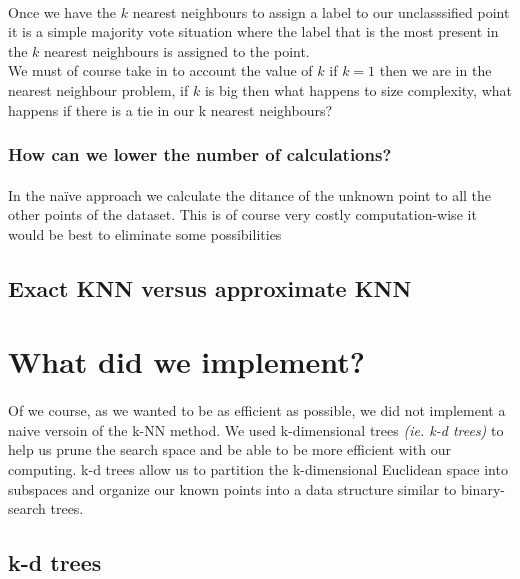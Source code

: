 \documentclass[11 pt]{article}
\begin{document}
\paragraph{}Once we have the $k$ nearest neighbours to assign a label to our unclasssified point it is a simple majority vote situation where the label that is the most present in the $k$ nearest neighbours is assigned to the point.\\
We must of course take in to account the value of $k$ if $k=1$ then we are in the nearest neighbour problem, if $k$ is big then what happens to size complexity, what happens if there is a tie in our k nearest neighbours?

\subsubsection{How can we lower the number of calculations?}
\paragraph{}In the na\"ive approach we calculate the ditance of the unknown point to all the other points of the dataset. This is of course very costly computation-wise it would be best to eliminate some possibilities


\subsection{Exact KNN versus approximate KNN}
\paragraph{}



\section{What did we implement?}
\paragraph{}Of we course, as we wanted to be as efficient as possible, we did not implement a naive versoin of the k-NN method. We used k-dimensional trees \emph{(ie. k-d trees)} to help us prune the search space and be able to be more efficient with our computing. k-d trees allow us to partition the k-dimensional Euclidean space into subspaces and organize our known points into a data structure similar to binary-search trees.
\subsection{k-d trees}
\end{document}
